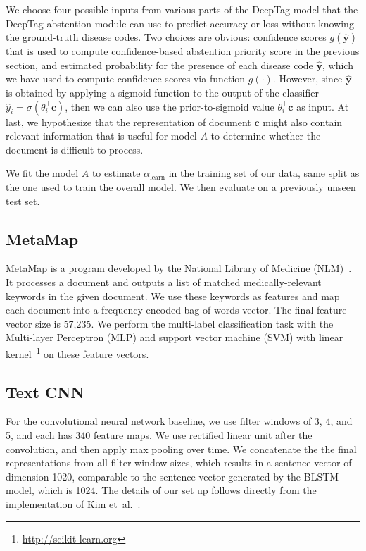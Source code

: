 \documentclass{article}[11pt,oneside]
\begin{document}
We choose four possible inputs from various parts of the DeepTag model that the DeepTag-abstention module can use to predict accuracy or loss without knowing the ground-truth disease codes. Two choices are obvious: confidence scores $g(\bm{\hat y})$ that is used to compute confidence-based abstention priority score in the previous section, and estimated probability for the presence of each disease code $\bm{\hat y}$, which we have used to compute confidence scores via function $g(\cdot)$. 
However, since $\bm{\hat y}$ is obtained by applying a sigmoid function to the output of the classifier $\hat y_i = \sigma(\theta_i^\intercal \bm{c})$, then we can also use the prior-to-sigmoid value $\theta_i^\intercal \bm{c}$ as input. At last, we hypothesize that the representation of document $\bm{c}$ might also contain relevant information that is useful for model $A$ to determine whether the document is difficult to process.

We fit the model $A$ to estimate $\alpha_\text{learn}$ in the training set of our data, same split as the one used to train the overall model. We then evaluate on a previously unseen test set.

\subsection{MetaMap}
MetaMap is a program developed by the National Library of Medicine (NLM)~\cite{aronson2010overview}. %
It processes a document and outputs a list of matched medically-relevant keywords in the given document.
We use these keywords as features and map each document into a frequency-encoded bag-of-words vector. The final feature vector size is 57,235.
We perform the multi-label classification task with the Multi-layer Perceptron (MLP) and support vector machine (SVM) with linear kernel~\footnote{\url{http://scikit-learn.org}} on these feature vectors.

\subsection{Text CNN}
For the convolutional neural network baseline, we use filter windows of 3, 4, and 5, and each has 340 feature maps. We use rectified linear unit after the convolution, and then apply  max pooling over time. We concatenate the the final representations from all filter window sizes, which results in a sentence vector of dimension 1020, comparable to the sentence vector generated by the BLSTM model, which is 1024. The details of our set up follows directly from the implementation of Kim et~al.~\cite{kim2014convolutional}.
\end{document}
